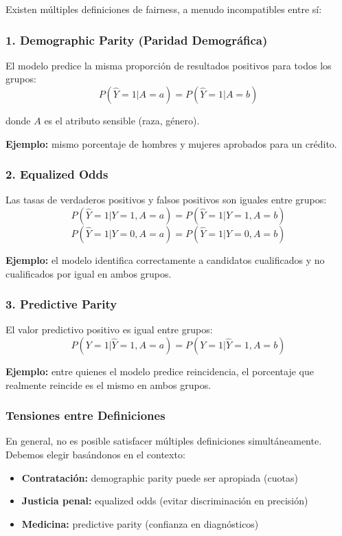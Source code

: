 \documentclass[11pt,a4paper]{article}
\begin{document}
Existen múltiples definiciones de fairness, a menudo incompatibles entre sí:

\subsubsection{1. Demographic Parity (Paridad Demográfica)}

El modelo predice la misma proporción de resultados positivos para todos los grupos:
$$P(\hat{Y}=1 | A=a) = P(\hat{Y}=1 | A=b)$$

donde $A$ es el atributo sensible (raza, género).

\textbf{Ejemplo:} mismo porcentaje de hombres y mujeres aprobados para un crédito.

\subsubsection{2. Equalized Odds}

Las tasas de verdaderos positivos y falsos positivos son iguales entre grupos:
$$P(\hat{Y}=1 | Y=1, A=a) = P(\hat{Y}=1 | Y=1, A=b)$$
$$P(\hat{Y}=1 | Y=0, A=a) = P(\hat{Y}=1 | Y=0, A=b)$$

\textbf{Ejemplo:} el modelo identifica correctamente a candidatos cualificados y no cualificados por igual en ambos grupos.

\subsubsection{3. Predictive Parity}

El valor predictivo positivo es igual entre grupos:
$$P(Y=1 | \hat{Y}=1, A=a) = P(Y=1 | \hat{Y}=1, A=b)$$

\textbf{Ejemplo:} entre quienes el modelo predice reincidencia, el porcentaje que realmente reincide es el mismo en ambos grupos.

\subsubsection{Tensiones entre Definiciones}

En general, no es posible satisfacer múltiples definiciones simultáneamente. Debemos elegir basándonos en el contexto:

\begin{itemize}
\item \textbf{Contratación:} demographic parity puede ser apropiada (cuotas)
\item \textbf{Justicia penal:} equalized odds (evitar discriminación en precisión)
\item \textbf{Medicina:} predictive parity (confianza en diagnósticos)
\end{itemize}
\end{document}
